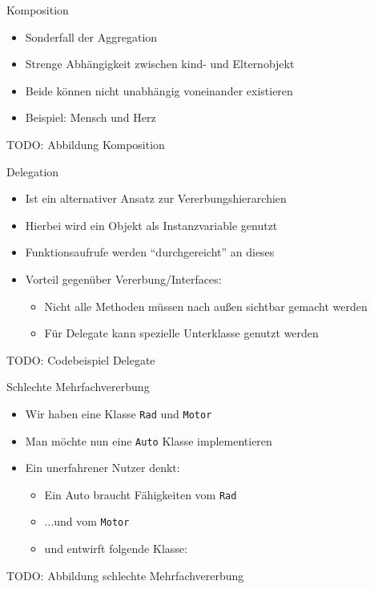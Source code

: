 \begin{frame}{Komposition}
    \begin{itemize}
        \item Sonderfall der Aggregation
        \item Strenge Abhängigkeit zwischen kind- und Elternobjekt
        \item Beide können nicht unabhängig voneinander existieren
        \item Beispiel: Mensch und Herz
    \end{itemize}
    TODO: Abbildung Komposition
\end{frame}

\begin{frame}{Delegation}
    \begin{itemize}
        \item Ist ein alternativer Ansatz zur Vererbungshierarchien
        \item Hierbei wird ein Objekt als Instanzvariable genutzt
        \item Funktionsaufrufe werden "`durchgereicht"' an dieses
        \item Vorteil gegenüber Vererbung/Interfaces:
        \begin{itemize}
            \item Nicht alle Methoden müssen nach außen sichtbar gemacht werden
            \item Für Delegate kann spezielle Unterklasse genutzt werden
        \end{itemize}
    \end{itemize}
    TODO: Codebeispiel Delegate
\end{frame}

\begin{frame}{Schlechte Mehrfachvererbung}
    \begin{itemize}
        \item Wir haben eine Klasse \texttt{Rad} und \texttt{Motor}
        \item Man möchte nun eine \texttt{Auto} Klasse implementieren
        \item Ein unerfahrener Nutzer denkt:
        \begin{itemize}
            \item Ein Auto braucht Fähigkeiten vom \texttt{Rad}
            \item ...und vom \texttt{Motor}
            \item und entwirft folgende Klasse:
        \end{itemize}
    \end{itemize}
    TODO: Abbildung schlechte Mehrfachvererbung
\end{frame}

